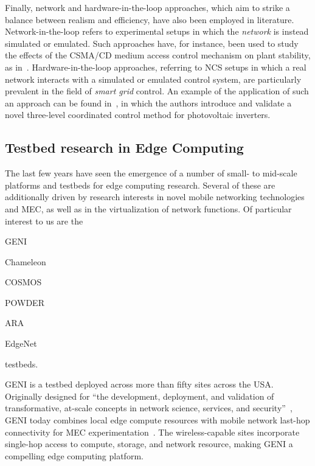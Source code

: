 Finally, network and hardware-in-the-loop approaches, which aim to strike a balance between realism and efficiency, have also been employed in literature.
Network-in-the-loop refers to experimental setups in which the \emph{network} is instead simulated or emulated.
Such approaches have, for instance, been used to study the effects of the \gls{CSMA/CD} medium access control mechanism on plant stability, as in~\cite{natale2004inverted}.
Hardware-in-the-loop approaches, referring to \gls{NCS} setups in which a real network interacts with a simulated or emulated control system, are particularly prevalent in the field of \emph{smart grid} control.
An example of the application of such an approach can be found in~\cite{wang2020inverter}, in which the authors introduce and validate a novel three-level coordinated control method for photovoltaic inverters.

\subsection{Testbed research in Edge Computing}


The last few years have seen the emergence of a number of small- to mid-scale platforms and testbeds for edge computing research.
Several of these are additionally driven by research interests in novel mobile networking technologies and \gls{MEC}, as well as in the virtualization of network functions.
Of particular interest to us are the
\begin{inlineenum}
    \item \acs{GENI}
    \item Chameleon
    \item \acs{COSMOS}
    \item \acs{POWDER}
    \item \acs{ARA}
    \item EdgeNet
\end{inlineenum} testbeds.

\gls{GENI} is a testbed deployed across more than fifty sites across the \gls{USA}.
Originally designed for ``the development, deployment, and validation of transformative, at-scale concepts in network science, services, and security''~\cite{berman2014geni}, \gls{GENI} today combines local edge compute resources with mobile network last-hop connectivity for \gls{MEC} experimentation~\cite{gosain2017geni}.
The wireless-capable sites incorporate single-hop access to compute, storage, and network resource, making \gls{GENI} a compelling edge computing platform.

